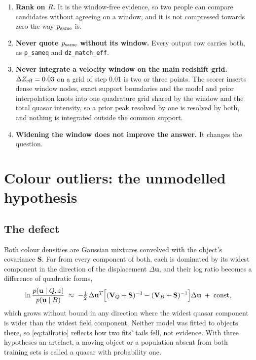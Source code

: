 \documentclass[11pt,a4paper]{article}
\newcommand{\uvec}{\mathbf{u}}
\begin{document}
\begin{enumerate}
\item \textbf{Rank on $R$.} It is the window-free evidence, so two people can
      compare candidates without agreeing on a window, and it is not compressed
      towards zero the way $p_{\rm same}$ is.
\item \textbf{Never quote $p_{\rm same}$ without its window.} Every output row
      carries both, as \texttt{p\_sameq} and \texttt{dz\_match\_eff}.
\item \textbf{Never integrate a velocity window on the main redshift grid.}
      $\Delta Z_{\rm eff}=0.03$ on a grid of step $0.01$ is two or three points.
      The scorer inserts dense window nodes, exact support boundaries and the
      model and prior interpolation knots into one quadrature grid shared by the
      window and the total quasar intensity, so a prior peak resolved by one is
      resolved by both, and nothing is integrated outside the common support.
\item \textbf{Widening the window does not improve the answer.} It changes the
      question.
\end{enumerate}

\section{Colour outliers: the unmodelled hypothesis}
\label{sec:outliers}

\subsection{The defect}

Both colour densities are Gaussian mixtures convolved with the object's
covariance $\mathbf S$. Far from every component of both, each is dominated by
its widest component in the direction of the displacement $\Delta\uvec$, and
their log ratio becomes a difference of quadratic forms,
%
\begin{equation}
\ln\frac{p(\uvec\mid Q,z)}{p(\uvec\mid B)} \;\approx\;
-\tfrac12\,\Delta\uvec^{T}\Bigl[(\mathbf V_Q+\mathbf S)^{-1}
-(\mathbf V_B+\mathbf S)^{-1}\Bigr]\Delta\uvec \;+\;\text{const},
\label{eq:tailratio}
\end{equation}
%
which grows without bound in any direction where the widest quasar component is
wider than the widest field component. Neither model was fitted to objects
there, so \eqref{eq:tailratio} reflects how two fits' tails fell, not evidence.
With three hypotheses an artefact, a moving object or a population absent from
both training sets is called a quasar with probability one.
\end{document}
